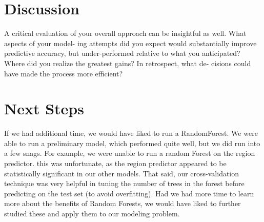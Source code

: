 \documentclass[11pt, oneside]{article}   	%
\begin{document}
\section*{Discussion}
A critical evaluation of your overall approach can be insightful as well. What aspects of your model- ing attempts did you expect would substantially improve predictive accuracy, but under-performed relative to what you anticipated? Where did you realize the greatest gains? In retrospect, what de- cisions could have made the process more efficient?

\section*{Next Steps}
If we had additional time, we would have liked to run a RandomForest. We were able to run a preliminary model, which performed quite well, but we did run into a few snags. For example, we were unable to run a random Forest on the region predictor. this was unfortunate, as the region predictor appeared to be statistically significant in our other models. That said, our cross-validation technique was very helpful in tuning the number of trees in the forest before predicting on the test set (to avoid overfitting). Had we had more time to learn more about the benefits of Random Forests, we would have liked to further studied these and apply them to our modeling problem.
\end{document}

